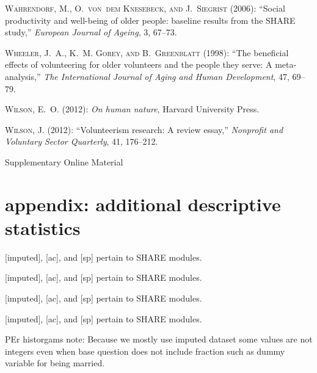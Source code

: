 \documentclass[10pt, letterpaper]{article}
\begin{document}
\begin{spacing}{1.4}
\begin{spacing}{.9}
\begin{thebibliography}{71}
\textsc{Wahrendorf, M., O.~von~dem Knesebeck, and J.~Siegrist} (2006):
  \enquote{Social productivity and well-being of older people: baseline results
  from the SHARE study,} \emph{European Journal of Ageing}, 3, 67--73.

\textsc{Wheeler, J.~A., K.~M. Gorey, and B.~Greenblatt} (1998): \enquote{The
  beneficial effects of volunteering for older volunteers and the people they
  serve: A meta-analysis,} \emph{The International Journal of Aging and Human
  Development}, 47, 69--79.

\textsc{Wilson, E.~O.} (2012{}): \emph{On human nature}, Harvard
  University Press.

\textsc{Wilson, J.} (2012{}): \enquote{Volunteerism research: A
  review essay,} \emph{Nonprofit and Voluntary Sector Quarterly}, 41, 176--212.

\end{thebibliography}


{\huge Supplementary Online Material}

\section{appendix: additional descriptive statistics}

 
{\footnotesize [imputed], [ac], and [sp] pertain to SHARE modules.}
 
{\footnotesize [imputed], [ac], and [sp] pertain to SHARE modules.}
 
{\footnotesize [imputed], [ac], and [sp] pertain to SHARE modules.}
 
{\footnotesize [imputed], [ac], and [sp] pertain to SHARE modules.}

PEr historgams note: Because we mostly use imputed dataset some values are not integers even when base
question does not include fraction such as dummy variable for being married. 









\end{spacing}
\end{spacing}
\end{document}
